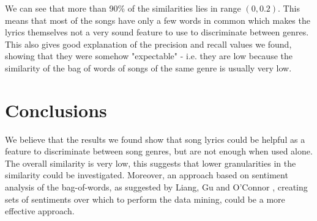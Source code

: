 \documentclass[a4paper, 11pt]{article} %
\begin{document}
We can see that more than 90\% of the similarities lies in range $(0, 0.2)$. This means that most of the songs have only a few words in common which makes the lyrics themselves not a very sound feature to use to discriminate between genres. This also gives good explanation of the precision and recall values we found, showing that they were somehow "expectable" - i.e. they are low because the similarity of the bag of words of songs of the same genre is usually very low.

\section{Conclusions}
We believe that the results we found show that song lyrics could be helpful as a feature to discriminate between song genres, but are not enough when used alone. The overall similarity is very low, this suggests that lower granularities in the similarity could be investigated. Moreover, an approach based on sentiment analysis of the bag-of-words, as suggested by Liang, Gu and O'Connor \cite{liang2011music}, creating sets of sentiments over which to perform the data mining, could be a more effective approach.







\end{document}
